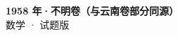 \documentclass[zihao=-4, a4paper]{ctexart}
\begin{document}
\begin{center}
  {\Large\bfseries 1958 年·不明卷（与云南卷部分同源）}\\[4pt]
  {\large 数学 · 试题版}
\end{center}
\medskip
{}

\end{document}
